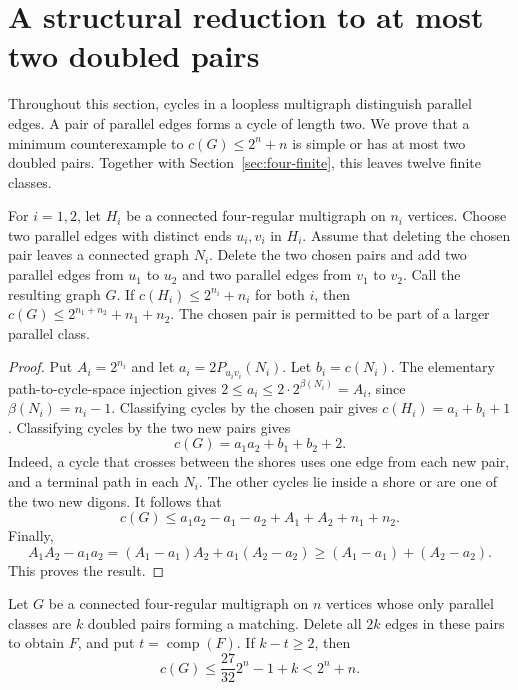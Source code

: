 \section{A structural reduction to at most two doubled pairs}\label{sec:four-structure}

Throughout this section, cycles in a loopless multigraph distinguish parallel edges.
A pair of parallel edges forms a cycle of length two.
We prove that a minimum counterexample to $c(G)\le 2^n+n$ is simple or has at most two doubled pairs.
Together with Section~\ref{sec:four-finite}, this leaves twelve finite classes.

\begin{lemma}\label{lem:four-glue}
For $i=1,2$, let $H_i$ be a connected four-regular multigraph on $n_i$ vertices.
Choose two parallel edges with distinct ends $u_i,v_i$ in $H_i$.
Assume that deleting the chosen pair leaves a connected graph $N_i$.
Delete the two chosen pairs and add two parallel edges from $u_1$ to $u_2$
and two parallel edges from $v_1$ to $v_2$.
Call the resulting graph $G$.
If $c(H_i)\le 2^{n_i}+n_i$ for both $i$, then $c(G)\le 2^{n_1+n_2}+n_1+n_2$.
The chosen pair is permitted to be part of a larger parallel class.
\end{lemma}

\begin{proof}
Put $A_i=2^{n_i}$ and let $a_i=2P_{u_iv_i}(N_i)$.
Let $b_i=c(N_i)$.
The elementary path-to-cycle-space injection gives
$2\le a_i\le 2\cdot2^{\beta(N_i)}=A_i$,
since $\beta(N_i)=n_i-1$.
Classifying cycles by the chosen pair gives $c(H_i)=a_i+b_i+1$.
Classifying cycles by the two new pairs gives
\[
 c(G)=a_1a_2+b_1+b_2+2.
\]
Indeed, a cycle that crosses between the shores uses one edge from each new pair,
and a terminal path in each $N_i$.
The other cycles lie inside a shore or are one of the two new digons.
It follows that
\[
 c(G)\le a_1a_2-a_1-a_2+A_1+A_2+n_1+n_2.
\]
Finally,
\[
 A_1A_2-a_1a_2
 =(A_1-a_1)A_2+a_1(A_2-a_2)
 \ge (A_1-a_1)+(A_2-a_2).
\]
This proves the result.
\end{proof}

\begin{lemma}\label{lem:four-parity}
Let $G$ be a connected four-regular multigraph on $n$ vertices whose only parallel classes
are $k$ doubled pairs forming a matching.
Delete all $2k$ edges in these pairs to obtain $F$, and put $t=\operatorname{comp}(F)$.
If $k-t\ge2$, then
\[
 c(G)\le \frac{27}{32}2^n-1+k<2^n+n.
\]
\end{lemma}

